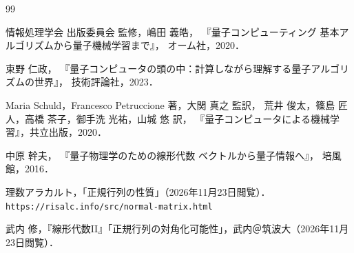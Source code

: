 \renewcommand{\bibname}{参考文献}

\begin{thebibliography}{99}
  情報処理学会 出版委員会 監修，嶋田 義皓，
  『量子コンピューティング 基本アルゴリズムから量子機械学習まで』，
  オーム社，2020．

  束野 仁政，
  『量子コンピュータの頭の中：計算しながら理解する量子アルゴリズムの世界』，
  技術評論社，2023．

  Maria Schuld，Francesco Petruccione 著，大関 真之 監訳，
  荒井 俊太，篠島 匠人，高橋 茶子，御手洗 光祐，山城 悠 訳，
  『量子コンピュータによる機械学習』，共立出版，2020．

  中原 幹夫，
  『量子物理学のための線形代数 ベクトルから量子情報へ』，
  培風館，2016．

  理数アラカルト，「正規行列の性質」（2026年11月23日閲覧）．\\
  \texttt{https://risalc.info/src/normal-matrix.html}

  武内 修，『線形代数II』「正規行列の対角化可能性」，武内＠筑波大（2026年11月23日閲覧）．\\
  \texttt{\noautoxspacing{}\kern0pt}
\end{thebibliography}

